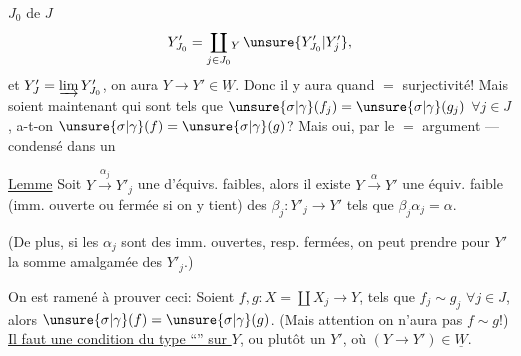 $J_0$ de $J$
\[
Y'_{J_0}=\coprod_{j\in J_0}\!{}_Y\,\unsure{Y'_{J_0}|Y'_j},
\]
et $Y'_J=\varinjlim Y'_{J_0}$, on aura $Y\longrightarrow Y'\in\underline W$. Donc il y aura quand $=$ surjectivité! Mais soient maintenant
qui  sont tels que $\unsure{\sigma|\gamma}(f_j)=\unsure{\sigma|\gamma}(g_j)$ $\forall j\in J$, a-t-on $\unsure{\sigma|\gamma}(f)=\unsure{\sigma|\gamma}(g)$? Mais oui, par le $=$ argument --- condensé dans un


\uline{Lemme} Soit $Y\xrightarrow{\alpha_j}Y'_j$  une  d'équivs. faibles, alors il existe $Y\xrightarrow{\alpha}Y'$ une équiv. faible   (imm. ouverte ou fermée si on y tient)  des $\beta_j:Y'_j\longrightarrow Y'$ tels que $\beta_j\alpha_j=\alpha$.


(De plus, si les $\alpha_j$ sont des imm. ouvertes, resp. fermées, on peut prendre pour $Y'$ la somme amalgamée des $Y'_j$.)

On est ramené à prouver ceci: Soient $f,g:X=\coprod X_j\longrightarrow Y$, tels que $f_j\sim g_j$ $\forall j\in J$, alors $\unsure{\sigma|\gamma}(f)=\unsure{\sigma|\gamma}(g)$. (Mais attention on n'aura pas $f\sim g$!) \uline{Il faut une condition du type ``'' sur $Y$}, ou plutôt un $Y'$, où $(Y\longrightarrow Y')\in\underline W$.
